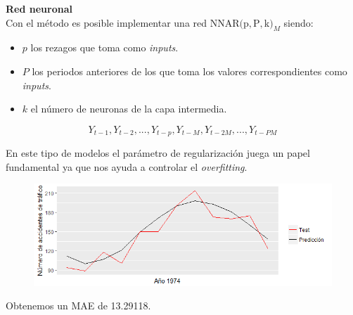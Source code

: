 \documentclass[10pt,a4paper,twoside]{beamer}
\begin{document}
\begin{frame}
\textbf{Red neuronal}\\
Con el método  es posible implementar una red NNAR$($p$, $P$, $k$)_M$ siendo:
\begin{itemize}
\item $p$ los rezagos que toma como \textit{inputs}.
\item $P$ los periodos anteriores de los que toma los valores correspondientes como \textit{inputs}.
\item $k$ el número de neuronas de la capa intermedia.
\end{itemize}

\begin{equation*}
    Y_{t-1}, Y_{t-2},...,Y_{t-p}, Y_{t-M}, Y_{t-2M},...,Y_{t-PM}
\end{equation*}

En este tipo de modelos el parámetro de regularización juega un papel fundamental ya que nos ayuda a controlar el \textit{overfitting}.
\begin{figure}
    \centering
    \centerline{\includegraphics[scale = 0.4]{Images/317.png}}
\end{figure}

Obtenemos un MAE de 13.29118.

\end{frame}

\end{document}
